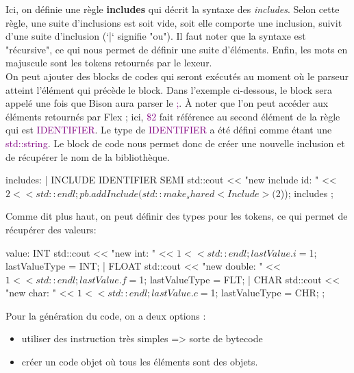\documentclass[a4paper]{article}%
\begin{document}
Ici, on définie une règle \textbf{includes} qui décrit la syntaxe des \textit{includes}. Selon cette règle, une suite d'inclusions est soit vide, soit elle comporte une inclusion, suivit d'une suite d'inclusion (`|` signifie "ou"). Il faut noter que la syntaxe est "récursive", ce qui nous permet de définir une suite d'éléments.
Enfin, les mots en majuscule sont les tokens retournés par le lexeur.\\

On peut ajouter des blocks de codes qui seront exécutés au moment où le parseur
atteint l'élément qui précède le block. Dans l'exemple ci-dessous, le block sera appelé une fois que Bison aura parser le \textcolor{purple}{;}. À noter que l'on peut accéder aux éléments retournés par Flex ; ici, \textcolor{purple}{\$2} fait référence au second élément de la règle qui est \textcolor{purple}{IDENTIFIER}. Le type de \textcolor{purple}{IDENTIFIER} a été défini comme étant une \textcolor{purple}{std::string}. Le block de code nous permet donc de créer une nouvelle inclusion et de récupérer le nom de la bibliothèque.\\

\begin{code}[language=c++]
includes: %
       |
       INCLUDE IDENTIFIER SEMI
       {
         std::cout << "new include id: " << $2 << std::endl;
         pb.addInclude(std::make_shared<Include>($2));
       }
       includes
       ;
\end{code}\leavevmode\newline


Comme dit plus haut, on peut définir des types pour les tokens, ce qui permet de
récupérer des valeurs:

\begin{code}[language=c++]
value: INT {
       std::cout << "new int: " << $1 << std::endl;
       lastValue.i = $1;
       lastValueType = INT;
     } | FLOAT {
       std::cout << "new double: " << $1 << std::endl;
       lastValue.f = $1;
       lastValueType = FLT;
     } | CHAR {
       std::cout << "new char: " << $1 << std::endl;
       lastValue.c = $1;
       lastValueType = CHR;
     }
     ;
\end{code}\leavevmode\newline

Pour la génération du code, on a deux options :
\begin{itemize}
\item utiliser des instruction très simples => sorte de bytecode
\item créer un code objet où tous les éléments sont des objets.
\end{itemize}\leavevmode\\~\\
\end{document}
